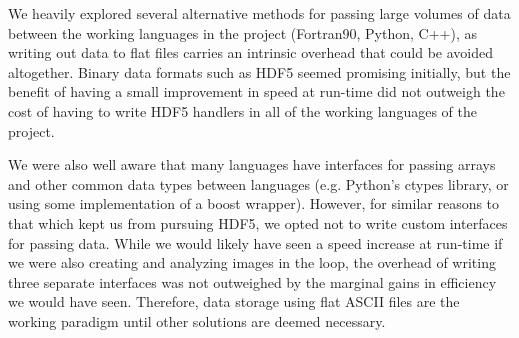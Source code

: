 We heavily explored several alternative methods for passing
large volumes of data between
the working languages in the project (Fortran90, Python, C++), as writing out
data to flat files carries an intrinsic overhead that could be avoided
altogether.
Binary data
formats such as HDF5 seemed promising initially, but the benefit of having a
small improvement in speed at run-time did not outweigh the cost of having to
write HDF5 handlers in all of the working languages of the project.

We were also well aware that many languages have interfaces for passing
arrays and other common data types between languages (e.g. Python's ctypes
library, or using some implementation of a boost wrapper).
However, for similar reasons to that which kept us from pursuing HDF5, we opted
not to write custom interfaces for passing data. While we would likely have seen
a speed increase at run-time if we were also creating and analyzing images in
the loop, the overhead of writing three separate interfaces was not outweighed
by the marginal gains in efficiency we would have seen.
Therefore, data storage using flat ASCII files are the working paradigm
until other solutions are deemed necessary.

